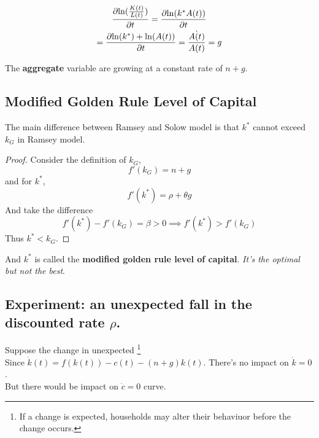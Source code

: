 \documentclass[]{article}
\begin{document}
			\begin{example}
				\begin{gather*}
					\frac{\partial{\ln(\frac{K(t)}{L(t)})}}{\partial{t}} = \frac{\partial{\ln(k^*A(t))}}{\partial{t}} \\
					= \frac{\partial{\ln(k^*) + \ln(A(t))}}{\partial{t}} = \frac{\dot{A(t)}}{A(t)} = g
				\end{gather*}
			\end{example}
			The \textbf{aggregate} variable are growing at a constant rate of $n+g$.
			
		\subsection{Modified Golden Rule Level of Capital}
			\par The main difference between Ramsey and Solow model is that $k^*$ cannot exceed $k_G$ in Ramsey model.
			\begin{proof}
				Consider the definition of $k_G$, 
				\[
					f'(k_G) = n + g
				\]
				and for $k^*$,
				\[
					f'(k^*) = \rho + \theta g
				\]
				And take the difference 
				\[
					f'(k^*) - f'(k_G) = \beta > 0 \implies f'(k^*) > f'(k_G)
				\]
				Thus $k^* < k_G$.
			\end{proof}
			And $k^*$ is called the \textbf{modified golden rule level of capital}. \emph{It's the optimal but not the best}.
		
		\subsection{Experiment: an unexpected fall in the discounted rate $\rho$.}
			\par Suppose the change in unexpected \footnote{If a change is expected, households may alter their behaviuor before the change occurs.} \\
			Since $\dot{k}(t) = f(k(t)) - c(t) - (n+g)k(t)$. There's no impact on $\dot{k}=0$. \\
			But there would be impact on $\dot{c} = 0$ curve. \\
\end{document}
